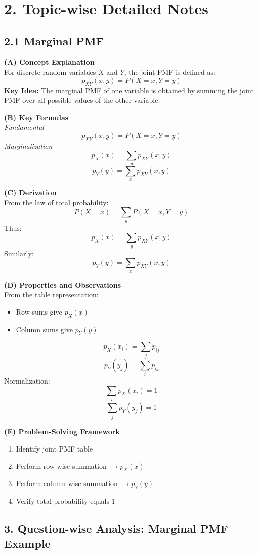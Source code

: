 \documentclass[12pt]{article}
\begin{document}
\hrulefill

\section*{2. Topic-wise Detailed Notes}

\subsection*{2.1 Marginal PMF}

\textbf{(A) Concept Explanation} \\
For discrete random variables $X$ and $Y$, the joint PMF is defined as:
\[ \boxed{p_{XY}(x,y)=P(X=x,Y=y)} \]
\textbf{Key Idea:} The marginal PMF of one variable is obtained by summing the joint PMF over all possible values of the other variable.

\textbf{(B) Key Formulas} \\
\textit{Fundamental}
\[ \boxed{p_{XY}(x,y)=P(X=x,Y=y)} \]
\textit{Marginalization}
\[ \boxed{p_{X}(x)=\sum_{y}p_{XY}(x,y)} \]
\[ \boxed{p_{Y}(y)=\sum_{x}p_{XY}(x,y)} \]

\textbf{(C) Derivation} \\
From the law of total probability:
\[ P(X=x)=\sum_{y}P(X=x,Y=y) \]
Thus:
\[ p_{X}(x)=\sum_{y}p_{XY}(x,y) \]
Similarly:
\[ p_{Y}(y)=\sum_{x}p_{XY}(x,y) \]

\textbf{(D) Properties and Observations} \\
From the table representation:
\begin{itemize}[noitemsep]
    \item Row sums give $p_{X}(x)$
    \item Column sums give $p_{Y}(y)$
\end{itemize}
\[ \boxed{p_{X}(x_{i})=\sum_{j}p_{ij}} \]
\[ \boxed{p_{Y}(y_{j})=\sum_{i}p_{ij}} \]
Normalization:
\[ \boxed{\sum_{i}p_{X}(x_{i})=1} \]
\[ \boxed{\sum_{j}p_{Y}(y_{j})=1} \]

\textbf{(E) Problem-Solving Framework}
\begin{enumerate}[noitemsep]
    \item Identify joint PMF table
    \item Perform row-wise summation $\rightarrow p_{X}(x)$
    \item Perform column-wise summation $\rightarrow p_{Y}(y)$
    \item Verify total probability equals 1
\end{enumerate}

\subsection*{3. Question-wise Analysis: Marginal PMF Example}
\end{document}
